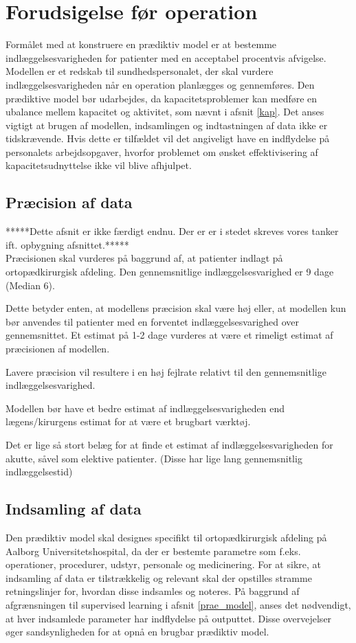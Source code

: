 \section{Forudsigelse før operation} 
Formålet med at konstruere en prædiktiv model er at bestemme indlæggelsesvarigheden for patienter med en acceptabel procentvis afvigelse. Modellen er et redskab til sundhedspersonalet, der skal vurdere indlæggelsesvarigheden når en operation planlægges og gennemføres. Den prædiktive model bør udarbejdes, da kapacitetsproblemer kan medføre en ubalance mellem kapacitet og aktivitet, som nævnt i afsnit \ref{kap}. Det anses vigtigt at brugen af modellen, indsamlingen og indtastningen af data ikke er tidskrævende. Hvis dette er tilfældet vil det angiveligt have en indflydelse på personalets arbejdsopgaver, hvorfor problemet om ønsket effektivisering af kapacitetsudnyttelse ikke vil blive afhjulpet.

\subsection{Præcision af data}
*****Dette afsnit er ikke færdigt endnu. Der er er i stedet skreves vores tanker ift. opbygning afsnittet.***** \\
Præcisionen skal vurderes på baggrund af, at patienter indlagt på ortopædkirurgisk afdeling. Den gennemsnitlige indlæggelsesvarighed er 9 dage (Median 6). 

Dette betyder enten, at modellens præcision skal være høj eller, at modellen kun bør anvendes til patienter med en forventet indlæggelsesvarighed over gennemsnittet.
Et estimat på 1-2 dage vurderes at være et rimeligt estimat af præcisionen af modellen.

Lavere præcision vil resultere i en høj fejlrate relativt til den gennemsnitlige indlæggelsesvarighed.


Modellen bør have et bedre estimat af indlæggelsesvarigheden end lægens/kirurgens estimat for at være et brugbart værktøj. 


Det er lige så stort belæg for at finde et estimat af indlæggelsesvarigheden for akutte, såvel som elektive patienter. (Disse har lige lang gennemsnitlig indlæggelsestid)


\subsection{Indsamling af data}
Den prædiktiv model skal designes specifikt til ortopædkirurgisk afdeling på Aalborg Universitetshospital, da der er bestemte parametre som f.eks. operationer, procedurer, udstyr, personale og medicinering. For at sikre, at indsamling af data er tilstrækkelig og relevant skal der opstilles stramme retningslinjer for, hvordan disse indsamles og noteres. På baggrund af afgrænsningen til supervised learning i afsnit \ref{prae_model}, anses det nødvendigt, at hver indsamlede parameter har indflydelse på outputtet. Disse overvejelser øger sandsynligheden for at opnå en brugbar prædiktiv model. 


